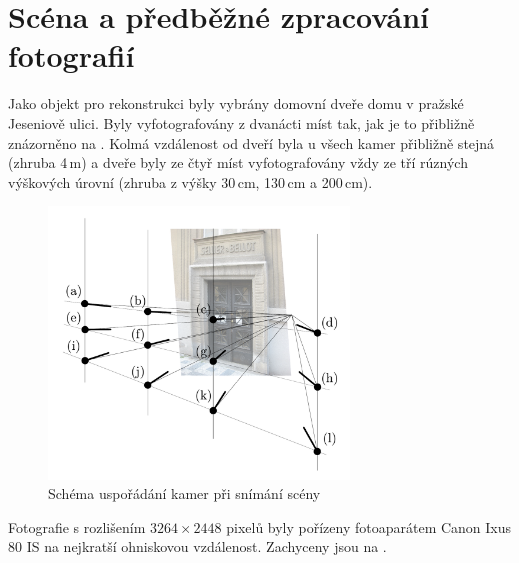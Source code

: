 \documentclass[11pt,oneside,a4paper,pdftex]{article}   %
\begin{document}

\section{Scéna a předběžné zpracování fotografií}

	Jako objekt pro rekonstrukci byly vybrány domovní dveře domu v pražské Jeseniově ulici. Byly
	vyfotografovány z dvanácti míst tak, jak je to přibližně znázorněno na .
	Kolmá vzdálenost od dveří byla u všech kamer přibližně stejná (zhruba 4\,m) a dveře byly ze čtyř
	míst vyfotografovány vždy ze tří rúzných výškových úrovní (zhruba z výšky 30\,cm, 130\,cm a
	200\,cm).
		\begin{figure}[htb]
			\centering
			\includegraphics[width=8cm]{pictures/usporadani_kamer.pdf}
			\caption{Schéma uspořádání kamer při snímání scény}
			\label{fig:usporadaniKamer}
		\end{figure}
	Fotografie s rozlišením $3264\times2448$ pixelů byly pořízeny fotoaparátem Canon Ixus 80
	IS na nejkratší ohniskovou vzdálenost. Zachyceny jsou na .
\end{document}
